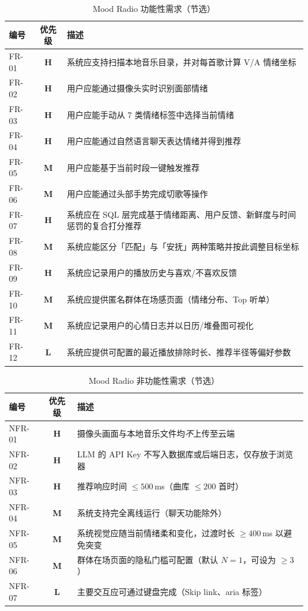 \begin{table}[!htb]
  \centering
  \caption{Mood Radio 功能性需求（节选）}\label{tab:fr}
  \begin{tabularx}{\linewidth}{>{\ttfamily}l>{\bfseries}cX}
    \toprule
    \textbf{编号} & \textbf{优先级} & \textbf{描述} \\
    \midrule
    FR-01 & H & 系统应支持扫描本地音乐目录，并对每首歌计算 V/A 情绪坐标 \\
    FR-02 & H & 用户应能通过摄像头实时识别面部情绪 \\
    FR-03 & H & 用户应能手动从 7 类情绪标签中选择当前情绪 \\
    FR-04 & H & 用户应能通过自然语言聊天表达情绪并得到推荐 \\
    FR-05 & M & 用户应能基于当前时段一键触发推荐 \\
    FR-06 & M & 用户应能通过头部手势完成切歌等操作 \\
    FR-07 & H & 系统应在 SQL 层完成基于情绪距离、用户反馈、新鲜度与时间惩罚的复合打分推荐 \\
    FR-08 & M & 系统应能区分「匹配」与「安抚」两种策略并按此调整目标坐标 \\
    FR-09 & H & 系统应记录用户的播放历史与喜欢/不喜欢反馈 \\
    FR-10 & M & 系统应提供匿名群体在场感页面（情绪分布、Top 听单） \\
    FR-11 & M & 系统应记录用户的心情日志并以日历/堆叠图可视化 \\
    FR-12 & L & 系统应提供可配置的最近播放排除时长、推荐半径等偏好参数 \\
    \bottomrule
  \end{tabularx}
\end{table}

\begin{table}[!htb]
  \centering
  \caption{Mood Radio 非功能性需求（节选）}\label{tab:nfr}
  \begin{tabularx}{\linewidth}{>{\ttfamily}l>{\bfseries}cX}
    \toprule
    \textbf{编号} & \textbf{优先级} & \textbf{描述} \\
    \midrule
    NFR-01 & H & 摄像头画面与本地音乐文件均\emph{不}上传至云端 \\
    NFR-02 & H & LLM 的 API Key 不写入数据库或后端日志，仅存放于浏览器 \\
    NFR-03 & H & 推荐响应时间 $\leq 500$\,ms（曲库 $\leq 200$ 首时） \\
    NFR-04 & M & 系统支持完全离线运行（聊天功能除外） \\
    NFR-05 & M & 系统视觉应随当前情绪柔和变化，过渡时长 $\geq 400$\,ms 以避免突变 \\
    NFR-06 & M & 群体在场页面的隐私门槛可配置（默认 $N=1$，可设为 $\geq 3$） \\
    NFR-07 & L & 主要交互应可通过键盘完成（Skip link、aria 标签） \\
    \bottomrule
  \end{tabularx}
\end{table}

